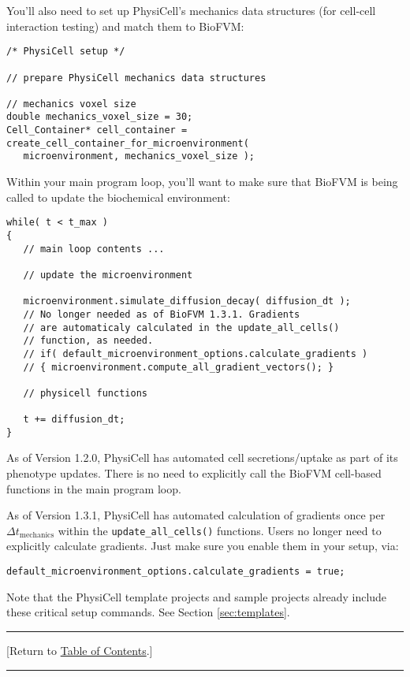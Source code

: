 \documentclass[12pt]{article}
\newcommand{\TOClink}{\begin{center}\hrule\vskip-10pt\phantom{.}\hfill[Return to \hyperlink{TOC}{Table of Contents}.]\hfill\phantom{.}\vskip3pt\hrule\end{center}}
\begin{document}
You'll also need to set up PhysiCell's mechanics data structures (for cell-cell interaction testing) and match them to BioFVM: 

\begin{verbatim}
/* PhysiCell setup */ 

// prepare PhysiCell mechanics data structures 

// mechanics voxel size 
double mechanics_voxel_size = 30; 
Cell_Container* cell_container = create_cell_container_for_microenvironment( 
   microenvironment, mechanics_voxel_size );
\end{verbatim}

Within your main program loop, you'll want to make sure that BioFVM is being called to 
update the biochemical environment: 

\begin{verbatim}
while( t < t_max )
{
   // main loop contents ... 

   // update the microenvironment
  
   microenvironment.simulate_diffusion_decay( diffusion_dt );
   // No longer needed as of BioFVM 1.3.1. Gradients 
   // are automaticaly calculated in the update_all_cells() 
   // function, as needed. 
   // if( default_microenvironment_options.calculate_gradients )
   // { microenvironment.compute_all_gradient_vectors(); }   
   
   // physicell functions 
  
   t += diffusion_dt; 
}
\end{verbatim}

As of Version 1.2.0, PhysiCell has automated cell secretions/uptake as part of its phenotype 
updates. There is no need to explicitly call the BioFVM cell-based functions in the main program loop.

As of Version 1.3.1, PhysiCell has automated calculation of gradients once per $\Delta t_\textrm{mechanics}$ 
within the \texttt{update\_all\_cells()} functions. Users no longer need to explicitly calculate gradients. 
Just make sure you enable them in your setup, via: 

\begin{verbatim}
default_microenvironment_options.calculate_gradients = true; 
\end{verbatim}

Note that the PhysiCell template projects and sample projects already include these critical setup commands. 
See Section \ref{sec:templates}. 

\TOClink 
\end{document}
